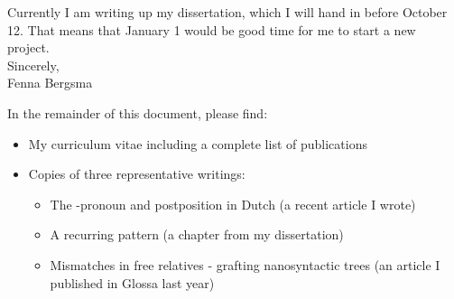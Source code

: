 \documentclass[12pt]{article}
\begin{document}
Currently I am writing up my dissertation, which I will hand in before October 12. That means that January 1 would be good time for me to start a new project.\\

Sincerely,\\
Fenna Bergsma










\newpage

In the remainder of this document, please find:

\begin{itemize}
  \item My curriculum vitae including a complete list of publications
  \item Copies of three representative writings:
  \begin{itemize}
    \item The -pronoun and postposition  in Dutch (a recent article I wrote)
    \item A recurring pattern (a chapter from my dissertation)
    \item Mismatches in free relatives - grafting nanosyntactic trees (an article I published in Glossa last year)
  \end{itemize}
\end{itemize}
\end{document}
